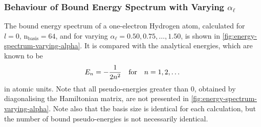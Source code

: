 \documentclass[]{article}
\begin{document}
\clearpage

\subsubsection{Behaviour of Bound Energy Spectrum with Varying $\alpha_{\ell}$}

The bound energy spectrum of a one-electron Hydrogen atom, calculated for
$l = 0$, $\mathrm{n_{basis}} = 64$, and for varying
$\alpha_{\ell} = 0.50, 0.75, \dotsc, 1.50$, is shown in
\autoref{fig:energy-spectrum-varying-alpha}.
It is compared with the analytical energies, which are known to be
\begin{equation*}
  E_{n}
  =
  -
  \dfrac{1}{2 n^{2}}
  \qq{for}
  n = 1, 2, \dotsc
\end{equation*}
in atomic units.
Note that all pseudo-energies greater than 0, obtained by diagonalising the
Hamiltonian matrix, are not presented in
\autoref{fig:energy-spectrum-varying-alpha}.
Note also that the basis size is identical for each calculation, but the number
of bound pseudo-energies is not necessarily identical.
\end{document}
